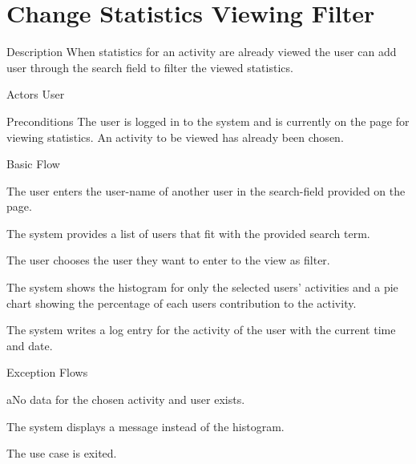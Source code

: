 \section{Change Statistics Viewing Filter}

%
\begin{cpart}{Description}
When statistics for an activity are already viewed the user can add user through the search field to filter the viewed statistics.
\end{cpart}


%
\begin{cpart}{Actors}
User
\end{cpart}

%
\begin{cpart}{Preconditions}
The user is logged in to the system and is currently on the page for viewing statistics. An activity to be viewed has already been chosen.
\end{cpart}

%
\begin{cpartList}{Basic Flow}
  \item The user enters the user-name of another user in the search-field provided on the page.
  \item The system provides a list of users that fit with the provided search term.
  \item The user chooses the user they want to enter to the view as filter.
  \item The system shows the histogram for only the selected users' activities and a pie chart showing the percentage of each users contribution to the activity.
  \item The system writes a log entry for the activity of the user with the current time and date.
\end{cpartList}

%
\begin{cpartList}{Exception Flows}
  \begin{innerList}{4}{a}{No data for the chosen activity and user exists.}
    \item The system displays a message instead of the histogram.
    \item The use case is exited.
  \end{innerList}
\end{cpartList}

\clearpage
